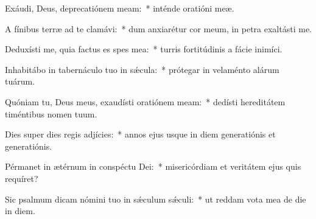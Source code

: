 \item Exáudi, Deus, deprecatiónem meam:~* inténde oratióni meæ.

\item A fínibus terræ ad te clamávi:~* dum anxiarétur cor meum, in petra exaltásti me.

\item Deduxísti me, quia factus es spes mea:~* turris fortitúdinis a fácie inimíci.

\item Inhabitábo in tabernáculo tuo in sǽcula:~* prótegar in velaménto alárum tuárum.

\item Quóniam tu, Deus meus, exaudísti oratiónem meam:~* dedísti hereditátem timéntibus nomen tuum.

\item Dies super dies regis adjícies:~* annos ejus usque in diem generatiónis et generatiónis.

\item Pérmanet in ætérnum in conspéctu Dei:~* misericórdiam et veritátem ejus quis requíret?

\item Sic psalmum dicam nómini tuo in sǽculum sǽculi:~* ut reddam vota mea de die in diem.
